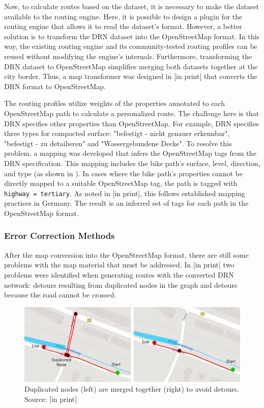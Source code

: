 Now, to calculate routes based on the dataset, it is necessary to make the dataset available to the routing engine. Here, it is possible to design a plugin for the routing engine that allows it to read the dataset's format. However, a better solution is to transform the DRN dataset into the OpenStreetMap format. In this way, the existing routing engine and its community-tested routing profiles can be reused without modifying the engine's internals. Furthermore, transforming the DRN dataset to OpenStreetMap simplifies merging both datasets together at the city border. Thus, a map transformer was designed in [in print] that converts the DRN format to OpenStreetMap.

The routing profiles utilize weights of the properties annotated to each OpenStreetMap path to calculate a personalized route. The challenge here is that DRN specifies other properties than OpenStreetMap. For example, DRN specifies three types for compacted surface: "befestigt - nicht genauer erkennbar", "befestigt - zu detailieren" and "Wassergebundene Decke". To resolve this problem, a mapping was developed that infers the OpenStreetMap tags from the DRN specification. This mapping includes the bike path's surface, level, direction, and type (as shown in ). In cases where the bike path's properties cannot be directly mapped to a suitable OpenStreetMap tag, the path is tagged with \texttt{highway = tertiary}. As noted in [in print], this follows established mapping practices in Germany. The result is an inferred set of tags for each path in the OpenStreetMap format.

\subsubsection{Error Correction Methods}

After the map conversion into the OpenStreetMap format, there are still some problems with the map material that must be addressed. In [in print] two problems were identified when generating routes with the converted DRN network: detours resulting from duplicated nodes in the graph and detours because the road cannot be crossed.

\begin{figure}[htbp]
\centering
\includegraphics[width=\linewidth]{images/node-merging.png}
\caption{Duplicated nodes (left) are merged together (right) to avoid detours. Source: [in print]}
\label{fig:node-merging}
\end{figure}

